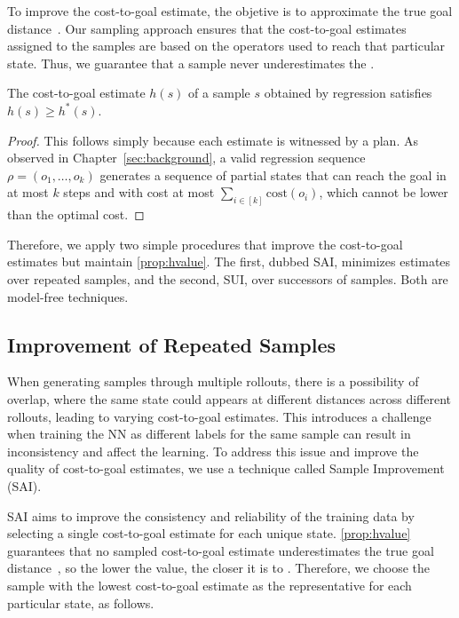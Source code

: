 To improve the cost-to-goal estimate, the objetive is to approximate the true goal distance~\hstar. Our sampling approach ensures that the cost-to-goal estimates assigned to the samples are based on the operators used to reach that particular state. Thus, we guarantee that a sample never underestimates the \hstar.

\begin{property}
    \label{prop:hvalue}
    The cost-to-goal estimate $h(s)$ of a sample $s$ obtained by regression satisfies $h(s)\geq h^*(s)$.
\end{property}
\begin{proof}
    This follows simply because each estimate is witnessed by a plan. As observed in Chapter~\ref{sec:background}, a valid regression sequence $\rho=(o_1,\ldots,o_k)$ generates a sequence of partial states that can reach the goal in at most $k$ steps and with cost at most $\sum_{i\in[k]}\text{cost}(o_i)$, which cannot be lower than the optimal cost.
\end{proof}

Therefore, we apply two simple procedures that improve the cost-to-goal estimates but maintain \cref{prop:hvalue}. The first, dubbed SAI, minimizes estimates over repeated samples, and the second, SUI, over successors of samples. Both are model-free techniques.

\subsection{Improvement of Repeated Samples}
\label{sec:hmin} 

When generating samples through multiple rollouts, there is a possibility of overlap, where the same state could appears at different distances across different rollouts, leading to varying cost-to-goal estimates. This introduces a challenge when training the NN as different labels for the same sample can result in inconsistency and affect the learning. To address this issue and improve the quality of cost-to-goal estimates, we use a technique called Sample Improvement (SAI).

SAI aims to improve the consistency and reliability of the training data by selecting a single cost-to-goal estimate for each unique state. \cref{prop:hvalue} guarantees that no sampled cost-to-goal estimate underestimates the true goal distance~\hstar, so the lower the value, the closer it is to \hstar. Therefore, we choose the sample with the lowest cost-to-goal estimate as the representative for each particular state, as follows.

